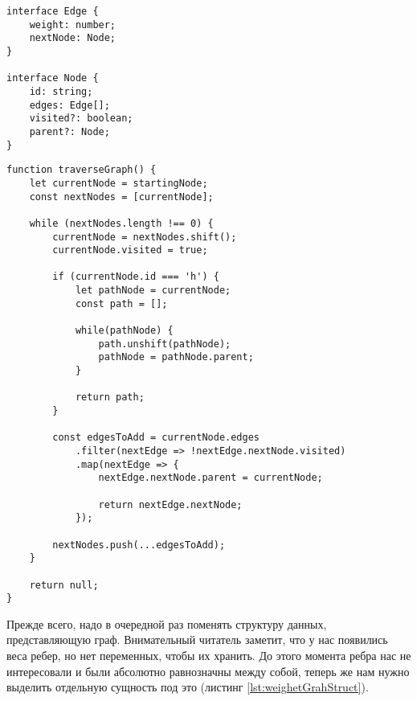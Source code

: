 \documentclass[../../article.tex]{subfiles}
\begin{document}
\begin{ruledelement}
        \begin{lstlisting}[caption={Структура для взвешенного графа}, label={lst:weighetGrahStruct}]
interface Edge {
    weight: number;
    nextNode: Node;
}

interface Node {
    id: string;
    edges: Edge[];
    visited?: boolean;
    parent?: Node;
}
    \end{lstlisting}
\end{ruledelement}

\begin{figure*}
    \begin{ruledelement}
        \begin{lstlisting}[caption={Поиск пути при обходе взвешенного графа в ширину}, label={lst:bfsWeightedRandomPath}]
function traverseGraph() {
    let currentNode = startingNode;
    const nextNodes = [currentNode];

    while (nextNodes.length !== 0) {
        currentNode = nextNodes.shift();
        currentNode.visited = true;

        if (currentNode.id === 'h') {
            let pathNode = currentNode;
            const path = [];

            while(pathNode) {
                path.unshift(pathNode);
                pathNode = pathNode.parent;
            }

            return path;
        }

        const edgesToAdd = currentNode.edges
            .filter(nextEdge => !nextEdge.nextNode.visited)
            .map(nextEdge => {
                nextEdge.nextNode.parent = currentNode;

                return nextEdge.nextNode;
            });

        nextNodes.push(...edgesToAdd);
    }

    return null;
}
        \end{lstlisting}
    \end{ruledelement}

\end{figure*}

Прежде всего, надо в очередной раз поменять структуру данных, представляющую граф. Внимательный читатель заметит, что у нас появились веса ребер, но нет переменных, чтобы их хранить. До этого момента ребра нас не интересовали и были абсолютно равнозначны между собой, теперь же нам нужно выделить отдельную сущность под это (листинг \ref{lst:weighetGrahStruct}).
\end{document}
